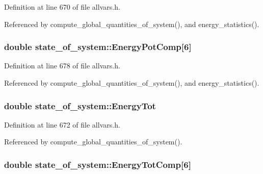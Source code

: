 Definition at line 670 of file allvars.h.



Referenced by compute\_\-global\_\-quantities\_\-of\_\-system(), and energy\_\-statistics().

\hypertarget{structstate__of__system_af495e90a93989d10e7f138c33c5cdad3}{
\subsubsection[{EnergyPotComp}]{\setlength{\rightskip}{0pt plus 5cm}double {\bf state\_\-of\_\-system::EnergyPotComp}\mbox{[}6\mbox{]}}}
\label{structstate__of__system_af495e90a93989d10e7f138c33c5cdad3}


Definition at line 678 of file allvars.h.



Referenced by compute\_\-global\_\-quantities\_\-of\_\-system(), and energy\_\-statistics().

\hypertarget{structstate__of__system_a2e6631f75e195c1b3cc446478bbdf413}{
\subsubsection[{EnergyTot}]{\setlength{\rightskip}{0pt plus 5cm}double {\bf state\_\-of\_\-system::EnergyTot}}}
\label{structstate__of__system_a2e6631f75e195c1b3cc446478bbdf413}


Definition at line 672 of file allvars.h.



Referenced by compute\_\-global\_\-quantities\_\-of\_\-system().

\hypertarget{structstate__of__system_a2e9e012733cab8c6352b8eb23dfa4763}{
\subsubsection[{EnergyTotComp}]{\setlength{\rightskip}{0pt plus 5cm}double {\bf state\_\-of\_\-system::EnergyTotComp}\mbox{[}6\mbox{]}}}
\label{structstate__of__system_a2e9e012733cab8c6352b8eb23dfa4763}



